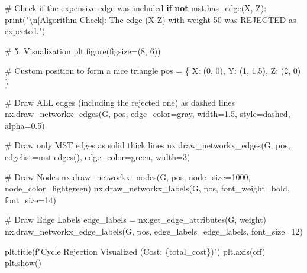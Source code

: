\documentclass[
  letterpaper,
  DIV=11,
  numbers=noendperiod]{scrreprt}
\newenvironment{Shaded}{\begin{snugshade}}{\end{snugshade}}
\newcommand{\BuiltInTok}[1]{\textcolor[rgb]{0.00,0.23,0.31}{#1}}
\newcommand{\CharTok}[1]{\textcolor[rgb]{0.13,0.47,0.30}{#1}}
\newcommand{\CommentTok}[1]{\textcolor[rgb]{0.37,0.37,0.37}{#1}}
\newcommand{\ControlFlowTok}[1]{\textcolor[rgb]{0.00,0.23,0.31}{\textbf{#1}}}
\newcommand{\DecValTok}[1]{\textcolor[rgb]{0.68,0.00,0.00}{#1}}
\newcommand{\FloatTok}[1]{\textcolor[rgb]{0.68,0.00,0.00}{#1}}
\newcommand{\KeywordTok}[1]{\textcolor[rgb]{0.00,0.23,0.31}{\textbf{#1}}}
\newcommand{\NormalTok}[1]{\textcolor[rgb]{0.00,0.23,0.31}{#1}}
\newcommand{\OperatorTok}[1]{\textcolor[rgb]{0.37,0.37,0.37}{#1}}
\newcommand{\SpecialCharTok}[1]{\textcolor[rgb]{0.37,0.37,0.37}{#1}}
\newcommand{\SpecialStringTok}[1]{\textcolor[rgb]{0.13,0.47,0.30}{#1}}
\newcommand{\StringTok}[1]{\textcolor[rgb]{0.13,0.47,0.30}{#1}}
\begin{document}
\begin{Shaded}
\begin{Highlighting}[]
\CommentTok{\# Check if the expensive edge was included}
\ControlFlowTok{if} \KeywordTok{not}\NormalTok{ mst.has\_edge(}\StringTok{\textquotesingle{}X\textquotesingle{}}\NormalTok{, }\StringTok{\textquotesingle{}Z\textquotesingle{}}\NormalTok{):}
    \BuiltInTok{print}\NormalTok{(}\StringTok{"}\CharTok{\textbackslash{}n}\StringTok{[Algorithm Check]: The edge (X{-}Z) with weight 50 was REJECTED as expected."}\NormalTok{)}

\CommentTok{\# 5. Visualization}
\NormalTok{plt.figure(figsize}\OperatorTok{=}\NormalTok{(}\DecValTok{8}\NormalTok{, }\DecValTok{6}\NormalTok{))}

\CommentTok{\# Custom position to form a nice triangle}
\NormalTok{pos }\OperatorTok{=}\NormalTok{ \{}
    \StringTok{\textquotesingle{}X\textquotesingle{}}\NormalTok{: (}\DecValTok{0}\NormalTok{, }\DecValTok{0}\NormalTok{),}
    \StringTok{\textquotesingle{}Y\textquotesingle{}}\NormalTok{: (}\DecValTok{1}\NormalTok{, }\FloatTok{1.5}\NormalTok{),}
    \StringTok{\textquotesingle{}Z\textquotesingle{}}\NormalTok{: (}\DecValTok{2}\NormalTok{, }\DecValTok{0}\NormalTok{)}
\NormalTok{\}}

\CommentTok{\# Draw ALL edges (including the rejected one) as dashed lines}
\NormalTok{nx.draw\_networkx\_edges(G, pos, edge\_color}\OperatorTok{=}\StringTok{\textquotesingle{}gray\textquotesingle{}}\NormalTok{, width}\OperatorTok{=}\FloatTok{1.5}\NormalTok{, style}\OperatorTok{=}\StringTok{\textquotesingle{}dashed\textquotesingle{}}\NormalTok{, alpha}\OperatorTok{=}\FloatTok{0.5}\NormalTok{)}

\CommentTok{\# Draw only MST edges as solid thick lines}
\NormalTok{nx.draw\_networkx\_edges(G, pos, edgelist}\OperatorTok{=}\NormalTok{mst.edges(), edge\_color}\OperatorTok{=}\StringTok{\textquotesingle{}green\textquotesingle{}}\NormalTok{, width}\OperatorTok{=}\DecValTok{3}\NormalTok{)}

\CommentTok{\# Draw Nodes}
\NormalTok{nx.draw\_networkx\_nodes(G, pos, node\_size}\OperatorTok{=}\DecValTok{1000}\NormalTok{, node\_color}\OperatorTok{=}\StringTok{\textquotesingle{}lightgreen\textquotesingle{}}\NormalTok{)}
\NormalTok{nx.draw\_networkx\_labels(G, pos, font\_weight}\OperatorTok{=}\StringTok{\textquotesingle{}bold\textquotesingle{}}\NormalTok{, font\_size}\OperatorTok{=}\DecValTok{14}\NormalTok{)}

\CommentTok{\# Draw Edge Labels}
\NormalTok{edge\_labels }\OperatorTok{=}\NormalTok{ nx.get\_edge\_attributes(G, }\StringTok{\textquotesingle{}weight\textquotesingle{}}\NormalTok{)}
\NormalTok{nx.draw\_networkx\_edge\_labels(G, pos, edge\_labels}\OperatorTok{=}\NormalTok{edge\_labels, font\_size}\OperatorTok{=}\DecValTok{12}\NormalTok{)}

\NormalTok{plt.title(}\SpecialStringTok{f"Cycle Rejection Visualized (Cost: }\SpecialCharTok{\{}\NormalTok{total\_cost}\SpecialCharTok{\}}\SpecialStringTok{)"}\NormalTok{)}
\NormalTok{plt.axis(}\StringTok{\textquotesingle{}off\textquotesingle{}}\NormalTok{)}
\NormalTok{plt.show()}
\end{Highlighting}
\end{Shaded}
\end{document}
